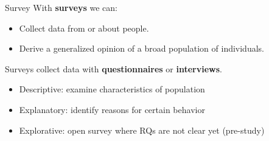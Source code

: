 \documentclass[10pt]{beamer}
\begin{document}
\begin{frame}{Survey}
	With \textbf{surveys} we can:
	
	\begin{itemize}
		\item Collect data from or about people.
		\item Derive a generalized opinion of a broad population of individuals.
	\end{itemize}	

	Surveys collect data with \textbf{questionnaires} or \textbf{interviews}.
	
	\begin{itemize}
		\item Descriptive: examine characteristics of population
		\item Explanatory: identify reasons for certain behavior
		\item Explorative: open survey where RQs are not clear yet (pre-study)
	\end{itemize}
	
\end{frame}
\end{document}
